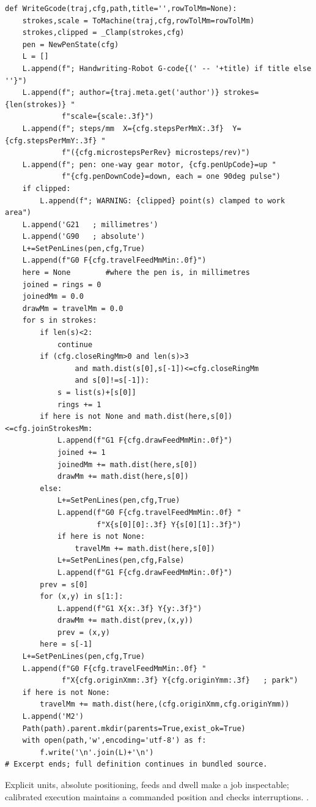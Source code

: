 \begin{lstlisting}[style=plain]
def WriteGcode(traj,cfg,path,title='',rowTolMm=None):
    strokes,scale = ToMachine(traj,cfg,rowTolMm=rowTolMm)
    strokes,clipped = _Clamp(strokes,cfg)
    pen = NewPenState(cfg)
    L = []
    L.append(f"; Handwriting-Robot G-code{(' -- '+title) if title else ''}")
    L.append(f"; author={traj.meta.get('author')} strokes={len(strokes)} "
             f"scale={scale:.3f}")
    L.append(f"; steps/mm  X={cfg.stepsPerMmX:.3f}  Y={cfg.stepsPerMmY:.3f} "
             f"({cfg.microstepsPerRev} microsteps/rev)")
    L.append(f"; pen: one-way gear motor, {cfg.penUpCode}=up "
             f"{cfg.penDownCode}=down, each = one 90deg pulse")
    if clipped:
        L.append(f"; WARNING: {clipped} point(s) clamped to work area")
    L.append('G21   ; millimetres')
    L.append('G90   ; absolute')
    L+=SetPenLines(pen,cfg,True)
    L.append(f"G0 F{cfg.travelFeedMmMin:.0f}")
    here = None        #where the pen is, in millimetres
    joined = rings = 0
    joinedMm = 0.0
    drawMm = travelMm = 0.0
    for s in strokes:
        if len(s)<2:
            continue
        if (cfg.closeRingMm>0 and len(s)>3
                and math.dist(s[0],s[-1])<=cfg.closeRingMm
                and s[0]!=s[-1]):
            s = list(s)+[s[0]]
            rings += 1
        if here is not None and math.dist(here,s[0])<=cfg.joinStrokesMm:
            L.append(f"G1 F{cfg.drawFeedMmMin:.0f}")
            joined += 1
            joinedMm += math.dist(here,s[0])
            drawMm += math.dist(here,s[0])
        else:
            L+=SetPenLines(pen,cfg,True)
            L.append(f"G0 F{cfg.travelFeedMmMin:.0f} "
                     f"X{s[0][0]:.3f} Y{s[0][1]:.3f}")
            if here is not None:
                travelMm += math.dist(here,s[0])
            L+=SetPenLines(pen,cfg,False)
            L.append(f"G1 F{cfg.drawFeedMmMin:.0f}")
        prev = s[0]
        for (x,y) in s[1:]:
            L.append(f"G1 X{x:.3f} Y{y:.3f}")
            drawMm += math.dist(prev,(x,y))
            prev = (x,y)
        here = s[-1]
    L+=SetPenLines(pen,cfg,True)
    L.append(f"G0 F{cfg.travelFeedMmMin:.0f} "
             f"X{cfg.originXmm:.3f} Y{cfg.originYmm:.3f}   ; park")
    if here is not None:
        travelMm += math.dist(here,(cfg.originXmm,cfg.originYmm))
    L.append('M2')
    Path(path).parent.mkdir(parents=True,exist_ok=True)
    with open(path,'w',encoding='utf-8') as f:
        f.write('\n'.join(L)+'\n')
# Excerpt ends; full definition continues in bundled source.
\end{lstlisting}
Explicit units, absolute positioning, feeds and dwell make a job inspectable; calibrated execution maintains a commanded position and checks interruptions. \cite{code2026,linuxcnc}.


